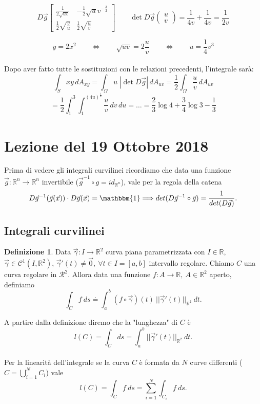\documentclass[10pt]{article}
\theoremstyle{plain}
\theoremstyle{definition}
\newtheorem{defn}{Definizione}
\begin{document}
$$ D\vec{g} \begin{bmatrix} \frac{1}{2\sqrt{uv}} & -\frac{1}{2} \sqrt{u} v^{-\frac{3}{2}}\\ \frac{1}{2} \sqrt{\frac{v}{u}} & \frac{1}{2} \sqrt{\frac{u}{v}} \end{bmatrix} \qquad \det D\vec{g} \left( \begin{matrix} u \\ v \end{matrix} \right) = \frac{1}{4v} + \frac{1}{4v} = \frac{1}{2v}$$

$$y=2x^2 \qquad \Leftrightarrow \qquad \sqrt{uv} = 2 \frac{u}{v} \qquad \Leftrightarrow \qquad u = \frac{1}{4} v^3 $$
\\
Dopo aver fatto tutte le sostituzioni con le relazioni precedenti, l'integrale sarà:
$$\int_S xy \,dA_{xy} = \int_{\Omega} u \; |\det D\vec{g}| \, dA_{uv} = \frac{1}{2} \int_{\Omega} \frac{u}{v} \,dA_{uv}$$
$$ = \frac{1}{2} \int_1^3 \int_1^{(4u)^{\frac{1}{3}}} \frac{u}{v} \,dv\,du = \dots =\frac{2}{3} \log 4 +\frac{3}{4} \log 3 - \frac{1}{3}$$



\section{Lezione del 19 Ottobre 2018}
Prima di vedere gli integrali curvilinei ricordiamo che data una funzione $\vec{g}:\mathbb{R}^n \to \mathbb{R}^n$ invertibile ($\vec{g}^{-1} \circ g = id_{\mathbb{R}^n}$), vale per la regola della catena 
$$D\vec{g}^{-1}(\vec{g}(\vec{x})) \cdot D\vec{g}(\vec{x}) = 
\mathbbm{1} \Longrightarrow det(D\vec{g}^{-1} \circ \vec{g}) = \frac{1}{det(D\vec{g})}.
$$
\subsection{Integrali curvilinei}
\begin{defn}
Data $\vec{\gamma}:I\to \mathbb{R}^2$ curva piana parametrizzata con $I\in \mathbb{R}$, $\vec{\gamma}\in \mathcal{C}^1(I,\mathbb{R}^2)$, $\vec{\gamma}'(t)\neq \vec{0},\ \forall t \in I=[a, b]$ intervallo regolare. Chiamo $C$ una curva regolare in $\mathcal{R}^2$.
Allora data una funzione $f:A\to \mathbb{R},\ A \in \mathbb{R}^2$ aperto, definiamo
$$
\int_Cf\ ds \doteq \int_a^b(f\circ\vec{\gamma})(t)\ ||\vec{\gamma}'(t)||_{\mathbb{R}^2}\ dt.
$$
\end{defn}
\bigskip
A partire dalla definizione diremo che la "lunghezza" di $C$ è
$$l(C)=\int_C ds = \int_a^b||\vec{\gamma}'(t)||_{\mathbb{R}^2}\ dt.$$
\\ Per la linearità dell'integrale se la curva $C$ è formata da $N$ curve differenti ($C=\bigcup_{i=1}^NC_i$) vale
$$l(C)=\int_C f\ ds = \sum_{i=1}^N\int_{C_i}f\ ds.$$
\end{document}
